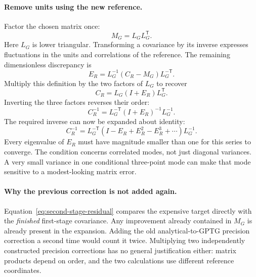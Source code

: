 \documentclass[11pt]{article}
\begin{document}
\paragraph{Remove units using the new reference.}
Factor the chosen matrix once:
\begin{equation}
 M_G=L_G L_G^{\mathsf T}.
\end{equation}
Here $L_G$ is lower triangular. Transforming a covariance by its inverse
expresses fluctuations in the units and correlations of the reference.
The remaining dimensionless discrepancy is
\begin{equation}
 E_R=L_G^{-1}(C_R-M_G)L_G^{-\mathsf T}.
 \label{eq:second-stage-residual}
\end{equation}
Multiply this definition by the two factors of $L_G$ to recover
\begin{equation}
 C_R=L_G(I+E_R)L_G^{\mathsf T}.
\end{equation}
Inverting the three factors reverses their order:
\begin{equation}
 C_R^{-1}=L_G^{-\mathsf T}(I+E_R)^{-1}L_G^{-1}.
\end{equation}
The required inverse can now be expanded about identity:
\begin{equation}
 C_R^{-1}=L_G^{-\mathsf T}
 \left(I-E_R+E_R^2-E_R^3+\cdots\right)L_G^{-1}.
 \label{eq:second-stage-series}
\end{equation}
Every eigenvalue of $E_R$ must have magnitude smaller than one for this
series to converge. The condition concerns correlated modes, not just
diagonal variances. A very small variance in one conditional three-point
mode can make that mode sensitive to a modest-looking matrix error.

\paragraph{Why the previous correction is not added again.}
Equation~\eqref{eq:second-stage-residual} compares the expensive target
directly with the \emph{finished} first-stage covariance. Any improvement
already contained in $M_G$ is already present in the expansion. Adding
the old analytical-to-GPTG precision correction a second time would count
it twice. Multiplying two independently constructed precision corrections
has no general justification either: matrix products depend on order,
and the two calculations use different reference coordinates.
\end{document}
